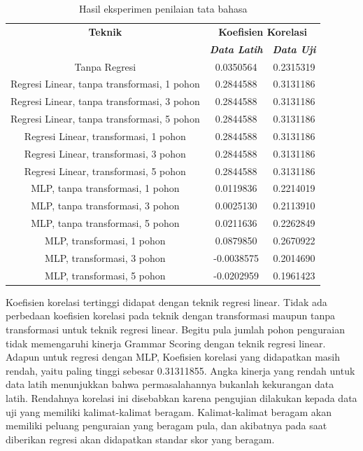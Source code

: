 \documentclass[conference]{IEEEtran}
\begin{document}
\begin{table}[h]
\caption{Hasil eksperimen penilaian tata bahasa}
\begin{center}
\begin{tabular}{|c|c|c|}
\hline
\textbf{Teknik}&\multicolumn{2}{|c|}{\textbf{Koefisien Korelasi}} \\
\cline{2-3} 
 & \textbf{\textit{Data Latih}}& \textbf{\textit{Data Uji}} \\
\hline
Tanpa Regresi& 0.0350564& 0.2315319 \\
Regresi Linear, tanpa transformasi, 1 pohon& 0.2844588&
0.3131186  \\
Regresi Linear, tanpa transformasi, 3 pohon&0.2844588 & 0.3131186 \\
Regresi Linear, tanpa transformasi, 5 pohon&0.2844588 & 0.3131186 \\
Regresi Linear, transformasi, 1 pohon&0.2844588 & 0.3131186 \\
Regresi Linear, transformasi, 3 pohon&0.2844588 &0.3131186  \\
Regresi Linear, transformasi, 5 pohon&0.2844588 & 0.3131186 \\
MLP, tanpa transformasi, 1 pohon&0.0119836 & 0.2214019 \\
MLP, tanpa transformasi, 3 pohon&0.0025130 &0.2113910  \\
MLP, tanpa transformasi, 5 pohon&0.0211636 & 0.2262849 \\
MLP, transformasi, 1 pohon&0.0879850 &0.2670922  \\
MLP, transformasi, 3 pohon&-0.0038575 &0.2014690  \\
MLP, transformasi, 5 pohon&-0.0202959 &0.1961423  \\
\hline
\end{tabular}
\label{tabeksperimenscoring}
\end{center}
\end{table}

Koefisien korelasi tertinggi didapat dengan teknik regresi linear. Tidak ada perbedaan koefisien korelasi pada teknik dengan transformasi maupun tanpa transformasi untuk teknik regresi linear. Begitu pula jumlah pohon penguraian tidak memengaruhi kinerja Grammar Scoring dengan teknik regresi linear. Adapun untuk regresi dengan MLP, 
Koefisien korelasi yang didapatkan masih rendah, yaitu paling tinggi sebesar 0.31311855. Angka kinerja yang rendah untuk data latih menunjukkan bahwa permasalahannya bukanlah kekurangan data latih. Rendahnya korelasi ini disebabkan karena pengujian dilakukan kepada data uji yang memiliki kalimat-kalimat beragam. Kalimat-kalimat beragam akan memiliki peluang penguraian yang beragam pula, dan akibatnya pada saat diberikan regresi akan didapatkan standar skor yang beragam.
\end{document}
